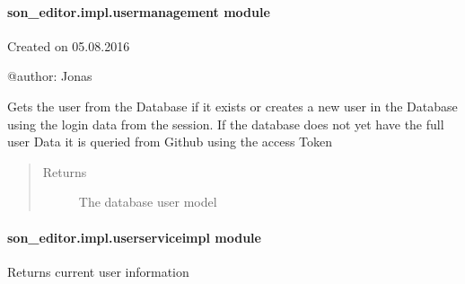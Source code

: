 \documentclass[letterpaper,10pt,english]{sphinxmanual}
\begin{document}
\paragraph{son\_editor.impl.usermanagement module}
\label{_source/son_editor.impl:module-son_editor.impl.usermanagement}\label{_source/son_editor.impl:son-editor-impl-usermanagement-module}
Created on 05.08.2016

@author: Jonas

\begin{fulllineitems}
\label{_source/son_editor.impl:son_editor.impl.usermanagement.get_user}
Gets the user from the Database if it exists or
creates a new user in the Database using the
login data from the session. If the database does
not yet have the full user Data it is queried
from Github using the access Token
\begin{quote}\begin{description}
\item[{Returns}] \leavevmode
The database user model

\end{description}\end{quote}

\end{fulllineitems}



\paragraph{son\_editor.impl.userserviceimpl module}
\label{_source/son_editor.impl:son-editor-impl-userserviceimpl-module}\label{_source/son_editor.impl:module-son_editor.impl.userserviceimpl}

\begin{fulllineitems}
\label{_source/son_editor.impl:son_editor.impl.userserviceimpl.get_user_info}
Returns current user information

\end{fulllineitems}

\end{document}

